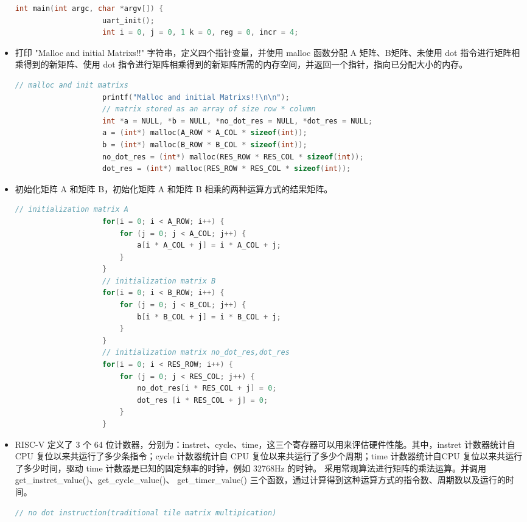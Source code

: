 \documentclass[a4paper, 14pt, oneside]{book} %
\numberwithin{equation}{subsection}
\begin{document}
\begin{itemize}
			\begin{lstlisting}[language={C++}]
				int main(int argc, char *argv[]) {
					uart_init();
					int i = 0, j = 0, 1 k = 0, reg = 0, incr = 4;			
				\end{lstlisting}
				\item 打印 "Malloc and initial Matrixs!!" 字符串，定义四个指针变量，并使用 malloc 函数分配 A 矩阵、B矩阵、未使用 dot 指令进行矩阵相乘得到的新矩阵、使用 dot 指令进行矩阵相乘得到的新矩阵所需的内存空间，并返回一个指针，指向已分配大小的内存。
				\begin{lstlisting}[language={C++}]
					// malloc and init matrixs
					printf("Malloc and initial Matrixs!!\n\n");
					// matrix stored as an array of size row * column
					int *a = NULL, *b = NULL, *no_dot_res = NULL, *dot_res = NULL;
					a = (int*) malloc(A_ROW * A_COL * sizeof(int));
					b = (int*) malloc(B_ROW * B_COL * sizeof(int));
					no_dot_res = (int*) malloc(RES_ROW * RES_COL * sizeof(int));
					dot_res = (int*) malloc(RES_ROW * RES_COL * sizeof(int));			
				\end{lstlisting}
				\item 初始化矩阵 A 和矩阵 B，初始化矩阵 A 和矩阵 B 相乘的两种运算方式的结果矩阵。
				\begin{lstlisting}[language={C++}]
					// initialization matrix A
					for(i = 0; i < A_ROW; i++) {
						for (j = 0; j < A_COL; j++) {
							a[i * A_COL + j] = i * A_COL + j;
						}
					}
					// initialization matrix B
					for(i = 0; i < B_ROW; i++) {
						for (j = 0; j < B_COL; j++) {
							b[i * B_COL + j] = i * B_COL + j;
						}
					}
					// initialization matrix no_dot_res,dot_res
					for(i = 0; i < RES_ROW; i++) {
						for (j = 0; j < RES_COL; j++) {
							no_dot_res[i * RES_COL + j] = 0;
							dot_res [i * RES_COL + j] = 0;
						}
					}		
				\end{lstlisting}
				\item RISC-V 定义了 3 个 64 位计数器，分别为：instret、cycle、time，这三个寄存器可以用来评估硬件性能。其中，instret 计数器统计自 CPU 复位以来共运行了多少条指令；cycle 计数器统计自 CPU 复位以来共运行了多少个周期；time 计数器统计自CPU 复位以来共运行了多少时间，驱动 time 计数器是已知的固定频率的时钟，例如 32768Hz 的时钟。
				采用常规算法进行矩阵的乘法运算。并调用 get\_instret\_value()、get\_cycle\_value()、
				get\_timer\_value() 三个函数，通过计算得到这种运算方式的指令数、周期数以及运行的时间。
				\begin{lstlisting}[language={C++}]
					// no dot instruction(traditional tile matrix multipication)

\end{lstlisting}
\end{itemize}
\end{document}
